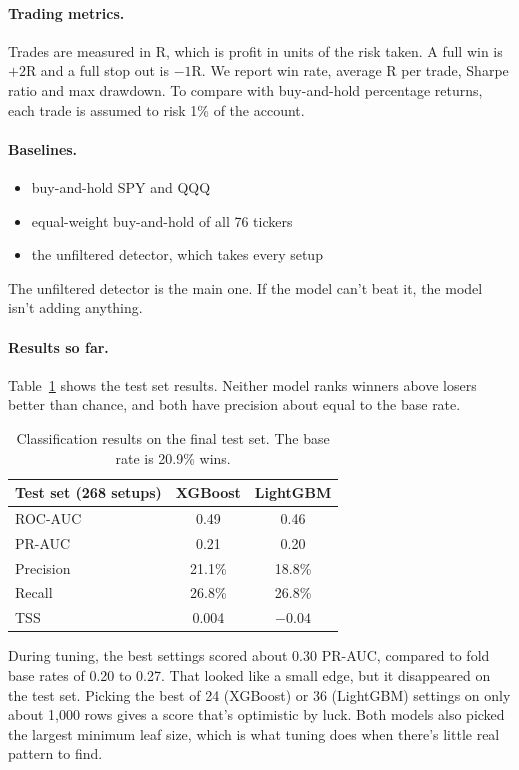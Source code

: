 \paragraph{Trading metrics.} Trades are measured in R, which is profit in units of the risk taken. A full win is $+2$R and a full stop out is $-1$R. We report win rate, average R per trade, Sharpe ratio and max drawdown. To compare with buy-and-hold percentage returns, each trade is assumed to risk 1\% of the account.

\paragraph{Baselines.}
\begin{itemize}
  \item buy-and-hold SPY and QQQ
  \item equal-weight buy-and-hold of all 76 tickers
  \item the unfiltered detector, which takes every setup
\end{itemize}
The unfiltered detector is the main one. If the model can't beat it, the model isn't adding anything.

\paragraph{Results so far.} Table~\ref{tab:test} shows the test set results. Neither model ranks winners above losers better than chance, and both have precision about equal to the base rate.

\begin{table}[t]
  \centering
  \small
  \begin{tabular}{lcc}
    \hline
    \textbf{Test set (268 setups)} & \textbf{XGBoost} & \textbf{LightGBM} \\
    \hline
    ROC-AUC   & 0.49   & 0.46   \\
    PR-AUC    & 0.21   & 0.20   \\
    Precision & 21.1\% & 18.8\% \\
    Recall    & 26.8\% & 26.8\% \\
    TSS       & 0.004  & $-0.04$ \\
    \hline
  \end{tabular}
  \caption{Classification results on the final test set. The base rate is 20.9\% wins.}
  \label{tab:test}
\end{table}

During tuning, the best settings scored about 0.30 PR-AUC, compared to fold base rates of 0.20 to 0.27. That looked like a small edge, but it disappeared on the test set. Picking the best of 24 (XGBoost) or 36 (LightGBM) settings on only about 1,000 rows gives a score that's optimistic by luck. Both models also picked the largest minimum leaf size, which is what tuning does when there's little real pattern to find.


